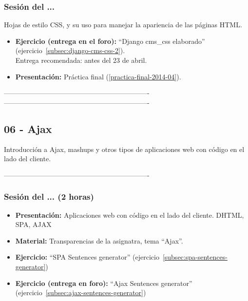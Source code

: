 \documentclass[a4paper,12pt]{article}
\begin{document}
\subsubsection{Sesión del ...}

Hojas de estilo CSS, y su uso para manejar la apariencia de las páginas HTML.

\begin{itemize}
\item \textbf{Ejercicio (entrega en el foro):} ``Django cms\_css elaborado'' (ejercicio~\ref{subsec:django-cms-css-2}). \\
Entrega recomendada: antes del 23 de abril.
\item \textbf{Presentación:} Práctica final (\ref{practica-final-2014-04}).
\end{itemize}

----------------------------------------------------------------
----------------------------------------------------------------
\subsection{06 - Ajax}

Introducción a Ajax, mashups y otros tipos de aplicaciones web con código en el lado del cliente.

----------------------------------------------------------------
\subsubsection{Sesión del ... (2 horas)}


\begin{itemize}
\item \textbf{Presentación:} Aplicaciones web con código en el lado del cliente. DHTML, SPA, AJAX
\item \textbf{Material:} Transparencias de la asignatra, tema ``Ajax''.
\item \textbf{Ejercicio:} ``SPA Sentences generator'' (ejercicio~\ref{subsec:spa-sentences-generator})
\item \textbf{Ejercicio (entrega en foro):} ``Ajax Sentences generator'' (ejercicio~\ref{subsec:ajax-sentences-generator})
\end{itemize}
\end{document}
